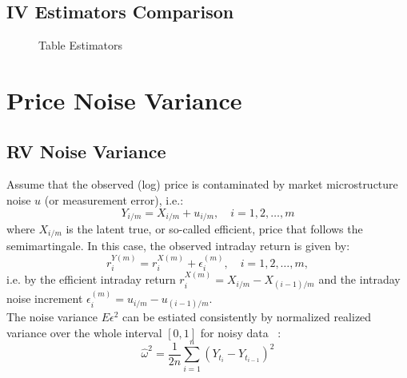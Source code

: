 \documentclass[letterpaper]{report}
\newcounter{N}
\begin{document}
\section{IV Estimators Comparison}
\thispagestyle{plain}
\begin{figure}[H]
\noindent 

\centering

\caption{Table Estimators}
\label{pic:TableEstimators}
\end{figure}


\chapter{Price Noise Variance}
\thispagestyle{plain}
\section{RV Noise Variance}
Assume that the observed (log) price is contaminated by market microstructure
noise $u$ (or measurement error), i.e.:
\begin{equation}
Y_{i/m} = X_{i/m} + u_{i/m}, \quad i = 1,2,\ldots, m
\end{equation}
where $X_{i/m}$ is the latent true, or so-called efficient, price that follows
the semimartingale. In this case, the observed intraday return is given
by:
\begin{equation}
r_i^{Y(m)} = r_i^{X(m)} + \epsilon_{i}^{(m)}, \quad i= 1,2,\ldots, m,
\end{equation}
i.e. by the efficient intraday return $r_i^{X(m)} = X_{i/m} - X_{(i-1)/m}$ and the intraday
noise increment $\epsilon_i^{(m)} = u_{i/m} - u_{(i-1)/m}$.\\

\noindent The noise variance $E\epsilon^2$ can be estiated consistently by normalized
realized variance over the whole interval $[0,1]$ for noisy data
~\cite[Zhang et al., 2005]{Zhang_Mykland_Ait-Sahalia}:
\begin{equation}
\label{Noise_Variance}
\hat{\omega}^2=\frac{1}{2n}\sum_{i=1}^{n} (Y_{t_i} - Y_{t_{i-1}})^2
\end{equation}
\end{document}
